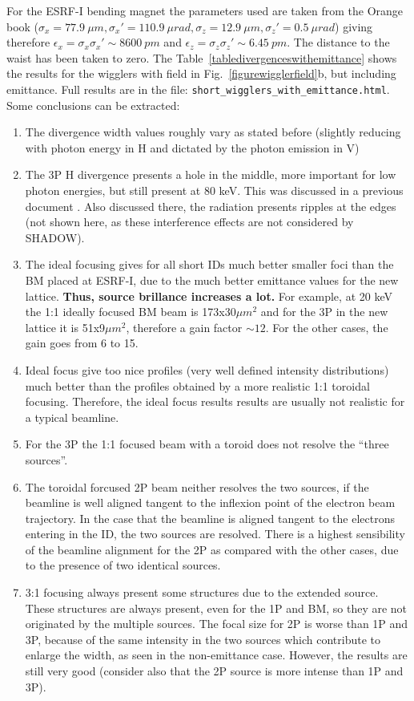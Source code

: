 \documentclass[a4paper,10pt]{article}
\begin{document}
For the ESRF-I bending magnet the parameters used are taken from the Orange book ($\sigma_x = 77.9~\mu m , \sigma_x'= 110.9~\mu rad, 
\sigma_z = 12.9~\mu m, \sigma_z' = 0.5~\mu rad$) giving therefore  $\epsilon_x = \sigma_x \sigma_x' \sim 8600~pm $ and   
$\epsilon_z = \sigma_z \sigma_z' \sim 6.45~pm $. The distance to the waist has been taken to zero.
% 
The Table~\ref{tabledivergenceswithemittance} shows the results for the wigglers with field in Fig.~\ref{figurewigglerfield}b, but 
including emittance. Full results are in the file: {\tt short\_wigglers\_with\_emittance.html}. Some conclusions can be extracted:
\begin{enumerate}
 \item The divergence width values roughly vary as stated before (slightly reducing with photon energy in H and dictated by the photon emission in V)
 \item The 3P H divergence presents a hole in the middle, more important for low photon energies, but still present at 80 keV. This was discussed
  in a previous document \cite{myoldreport}. Also discussed there, the radiation presents ripples at the edges (not shown here, as these 
  interference effects are not considered by SHADOW). 
 \item The ideal focusing gives for all short IDs much better smaller foci than the BM placed at ESRF-I, due to the much better emittance values for 
 the new lattice. {\bf Thus, source brillance increases a lot.} For example, at 20 keV the 1:1 ideally focused BM beam is 173x30$\mu m^2$ and for
 the 3P in the new lattice it is 51x9$\mu m^2$, therefore a gain factor $\sim 12$. For the other cases, the gain goes from 6 to 15. 
 \item Ideal focus give too nice profiles (very well defined intensity distributions) much better than the profiles obtained by a more
 realistic 1:1 toroidal focusing. 
 Therefore, the ideal focus results results are usually not realistic for a typical beamline.
 \item For the 3P the 1:1 focused beam with a toroid does not resolve the ``three sources''. 
 \item The toroidal forcused 2P beam neither resolves the two sources, if the beamline is well aligned tangent to the inflexion point of the electron
 beam trajectory. In the case that the beamline is aligned tangent to the electrons entering in the ID, the two sources are resolved. There is a highest
 sensibility of the beamline alignment for the 2P as compared with the other cases, due to the presence of two identical sources.  
 \item 3:1 focusing always present some structures due to the extended source. These structures are always present, even for the 1P and BM, 
 so they are not originated by the multiple sources. 
 The focal size for 2P is worse than 1P and 3P, because of the same intensity in the two sources which contribute to enlarge the width, 
 as seen in the non-emittance case. However, the results are still very good (consider also that the 2P source is more intense than 1P and 3P).

 
\end{enumerate}
\end{document}
